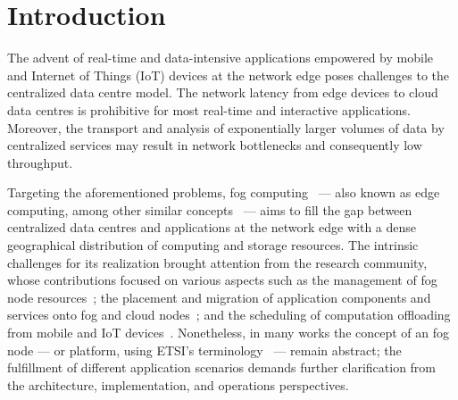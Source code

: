 \section{Introduction}

The advent of real-time and data-intensive applications empowered by mobile and Internet of Things (IoT) devices 
at the network edge 
poses challenges to the centralized data centre model. The network latency from edge devices to cloud data centres is prohibitive for most real-time and interactive applications.
Moreover, the transport and analysis of exponentially larger volumes of data by centralized services may result in network bottlenecks and consequently low throughput. 

Targeting the aforementioned problems, fog computing~\cite{Bonomi:2012} --- also known as edge computing, among other similar concepts~\cite{Satyanarayanan:2009,Taleb:2013,ETSI:MEC:2016:03} --- aims to fill the gap between centralized data centres and applications at the network edge with a dense geographical distribution of computing and storage resources. The intrinsic challenges for its realization brought attention from the research community, whose contributions focused on various aspects such as the management of fog node resources~\cite{N.Wang:2017}; the placement and migration of application components and services onto fog and cloud nodes~\cite{Wang:2015a,Wang:2017,Machen:2018}; and the scheduling of computation offloading from mobile and IoT devices~\cite{Liu:2016, OrsiniBL16}. Nonetheless, in many works the concept of an fog node --- or platform, using ETSI's terminology~\cite{ETSI:MEC:2016:03} --- remain abstract; the fulfillment of different application scenarios demands further clarification from the architecture, implementation, and operations perspectives.











